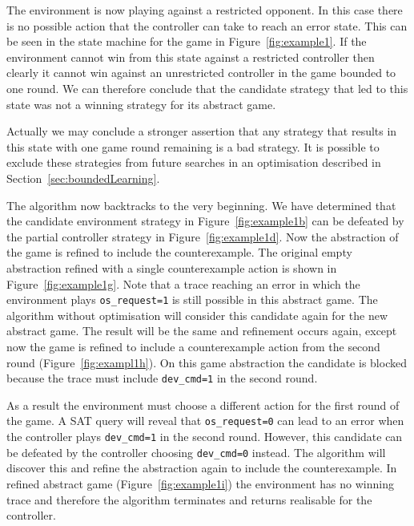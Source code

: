 The environment is now playing against a restricted opponent. In this case there is no possible action that the controller can take to reach an error state. This can be seen in the state machine for the game in Figure~\ref{fig:example1}. If the environment cannot win from this state against a restricted controller then clearly it cannot win against an unrestricted controller in the game bounded to one round. We can therefore conclude that the candidate strategy that led to this state was not a winning strategy for its abstract game.

Actually we may conclude a stronger assertion that any strategy that results in this state with one game round remaining is a bad strategy. It is possible to exclude these strategies from future searches in an optimisation described in Section~\ref{sec:boundedLearning}.

The algorithm now backtracks to the very beginning. We have determined that the candidate environment strategy in Figure~\ref{fig:example1b} can be defeated by the partial controller strategy in Figure~\ref{fig:example1d}. Now the abstraction of the game is refined to include the counterexample. The original empty abstraction refined with a single counterexample action is shown in Figure~\ref{fig:example1g}. Note that a trace reaching an error in which the environment plays \texttt{os\_request=1} is still possible in this abstract game. The algorithm without optimisation will consider this candidate again for the new abstract game. The result will be the same and refinement occurs again, except now the game is refined to include a counterexample action from the second round (Figure~\ref{fig:exampl1h}). On this game abstraction the candidate is blocked because the trace must include \texttt{dev\_cmd=1} in the second round.

As a result the environment must choose a different action for the first round of the game. A SAT query will reveal that \texttt{os\_request=0} can lead to an error when the controller plays \texttt{dev\_cmd=1} in the second round. However, this candidate can be defeated by the controller choosing \texttt{dev\_cmd=0} instead. The algorithm will discover this and refine the abstraction again to include the counterexample. In refined abstract game (Figure~\ref{fig:example1i}) the environment has no winning trace and therefore the algorithm terminates and returns realisable for the controller.

